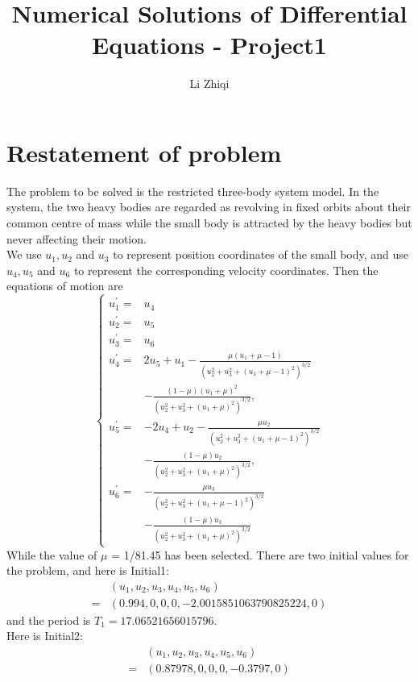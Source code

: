 \documentclass[a4paper,twocolumn]{article}
\title{Numerical Solutions of Differential Equations - Project1}
\author{Li Zhiqi\quad3180103041}
\theoremstyle{definition}
\begin{document}
\maketitle
\section{Restatement of problem}
The problem to be solved is the restricted three-body system model. In the system, the two heavy bodies are regarded as revolving in fixed orbits about their common centre of mass while the small body is attracted by the heavy bodies but never affecting their motion.\\  We use $u_1,u_2$ and $u_3$ to represent position coordinates of the small body, and use $u_4,u_5$ and $u_6$ to represent the corresponding velocity coordinates. Then the equations of motion are
$$
\left\{\begin{aligned}
u_{1}^{\prime}=& u_{4} \\
u_{2}^{\prime}=& u_{5} \\
u_{3}^{\prime}=& u_{6} \\
u_{4}^{\prime}=& 2 u_{5}+u_{1}-\frac{\mu\left(u_{1}+\mu-1\right)}{\left(u_{2}^{2}+u_{3}^{2}+\left(u_{1}+\mu-1\right)^{2}\right)^{3 / 2}} \\
&-\frac{(1-\mu)\left(u_{1}+\mu\right)^{2}}{\left(u_{2}^{2}+u_{3}^{2}+\left(u_{1}+\mu\right)^{2}\right)^{3 / 2}}, \\
u_{5}^{\prime}=&-2 u_{4}+u_{2}-\frac{\mu u_{2}}{\left(u_{2}^{2}+u_{3}^{2}+\left(u_{1}+\mu-1\right)^{2}\right)^{3 / 2}} \\
&-\frac{(1-\mu) u_{2}}{\left(u_{2}^{2}+u_{3}^{2}+\left(u_{1}+\mu\right)^{2}\right)^{3 / 2}}, \\
u_{6}^{\prime}=&-\frac{\mu u_{3}}{\left(u_{2}^{2}+u_{3}^{2}+\left(u_{1}+\mu-1\right)^{2}\right)^{3 / 2}} \\
&-\frac{(1-\mu) u_{3}}{\left(u_{2}^{2}+u_{3}^{2}+\left(u_{1}+\mu\right)^{2}\right)^{3 / 2}}
\end{aligned}\right.
$$
While the value of $\mu$ = 1/81.45 has been selected. There are two initial values for the problem, and here is Initial1:
$$
\begin{aligned} &\left(u_{1}, u_{2}, u_{3}, u_{4}, u_{5}, u_{6}\right) \\=&(0.994,0,0,0,-2.0015851063790825224,0)
\end{aligned}
$$
and the period is $T_{1}=17.06521656015796 .$\\
Here is Initial2:
$$
\begin{aligned} &\left(u_{1}, u_{2}, u_{3}, u_{4}, u_{5}, u_{6}\right) \\=&(0.87978,0,0,0,-0.3797,0) 
\end{aligned}
$$
\end{document}
